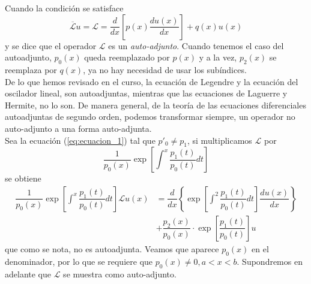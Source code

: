 Cuando la condición se satisface
\begin{equation}
\overline{\mathscr{L}} u = \mathscr{L} = \dfrac{d}{dx} \left[ p(x) \dfrac{d u(x)}{dx} \right] + q(x) u(x)
\label{eq:ecuacion_4}
\end{equation}
y se dice que el operador $\mathscr{L}$ es un \emph{auto-adjunto}. Cuando tenemos el caso del autoadjunto, $p_{0}(x)$ queda reemplazado por $p(x)$ y a la vez, $p_{2}(x)$ se reemplaza por $q(x)$, ya no hay necesidad de usar los subíndices.
\\
De lo que hemos revisado en el curso, la ecuación de Legendre y la ecuación del oscilador lineal, son autoadjuntas, mientras que las ecuaciones de Laguerre y Hermite, no lo son. De manera general, de la teoría de las ecuaciones diferenciales autoadjuntas de segundo orden, podemos transformar siempre, un operador no auto-adjunto a una forma auto-adjunta.
\\
Sea la ecuación (\ref{eq:ecuacion_1}) tal que $p'_{0}\neq p_{1}$, si multiplicamos $\mathscr{L}$ por
\[ \dfrac{1}{p_{0} (x)} \exp \left[ \int^{x} \dfrac{p_{1}(t)}{p_{0}(t)} dt \right] \]
se obtiene
\begin{equation}
\begin{split}
\dfrac{1}{p_{0} (x)} \exp \left[ \int^{x} \dfrac{p_{1}(t)}{p_{0}(t)} dt \right] \mathscr{L} u (x) &= \dfrac{d}{dx} \left\lbrace \exp \left[ \int^{2} \dfrac{p_{1}(t)}{p_{0}(t)} dt \right] \dfrac{du(x)}{dx} \right\rbrace \\
&+ \dfrac{p_{2}(x)}{p_{0}(x)} \cdot \exp \left[ \dfrac{p_{1}(t)}{p_{0}(t)} \right] u
\end{split}
\end{equation}
que como se nota, no es autoadjunta. Veamos que aparece $p_{0}(x)$ en el denominador, por lo que se requiere que $p_{0}(x) \neq 0, a < x < b$. Supondremos en adelante que $\mathscr{L}$ se muestra como auto-adjunto.
